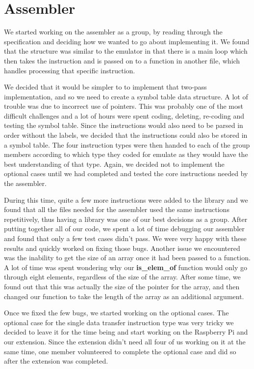 \documentclass[11pt]{article}
\begin{document}
\section{Assembler}
We started working on the assembler as a group, by reading through the specification and deciding how we wanted to go about implementing it. We found that the structure was similar to the emulator in that there is a main loop which then takes the instruction and is passed on to a function in another file, which handles processing that specific instruction.

We decided that it would be simpler to to implement that two-pass implementation, and so we need to create a symbol table data structure. A lot of trouble was due to incorrect use of pointers. This was probably one of the most difficult challenges and a lot of hours were spent coding, deleting, re-coding and testing the symbol table. Since the instructions would also need to be parsed in order without the labels, we decided that the instructions could also be stored in a symbol table. The four instruction types were then handed to each of the group members according to which type they coded for emulate as they would have the best understanding of that type. Again, we decided not to implement the optional cases until we had completed and tested the core instructions needed by the assembler.

During this time, quite a few more instructions were added to the library and we found that all the files needed for the assembler used the same instructions repetitively, thus having a library was one of our best decisions as a group. After putting together all of our code, we spent a lot of time debugging our assembler and found that only a few test cases didn't pass. We were very happy with these results and quickly worked on fixing those bugs. Another issue we encountered was the inability to get the size of an array once it had been passed to a function. A lot of time was spent wondering why our {\bf is\_elem\_of} function would only go through eight elements, regardless of the size of the array. After some time, we found out that this was actually the size of the pointer for the array, and then changed our function to take the length of the array as an additional argument.

Once we fixed the few bugs, we started working on the optional cases. The optional case for the single data transfer instruction type was very tricky we decided to leave it for the time being and start working on the Raspberry Pi and our extension. Since the extension didn't need all four of us working on it at the same time, one member volunteered to complete the optional case and did so after the extension was completed.
 
\end{document}
